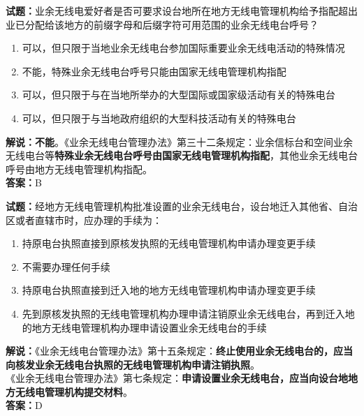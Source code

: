 \documentclass{ctexbook}
\begin{document}
\bigskip


\noindent\textbf{试题：}业余无线电爱好者是否可要求设台地所在地方无线电管理机构给予指配超出业已分配给该地方的前缀字母和后缀字符可用范围的业余无线电台呼号？
\begin{enumerate}[leftmargin=3em]
\item 可以，但只限于当地业余无线电台参加国际重要业余无线电活动的特殊情况
\item 不能，特殊业余无线电台呼号只能由国家无线电管理机构指配
\item 可以，但只限于与在当地所举办的大型国际或国家级活动有关的特殊电台
\item 可以，但只限于与当地政府组织的大型科技活动有关的特殊电台
\end{enumerate}
\textbf{解说：不能}。《业余无线电台管理办法》第三十二条规定：业余信标台和空间业余无线电台等\textbf{特殊业余无线电台呼号由国家无线电管理机构指配}，其他业余无线电台呼号由地方无线电管理机构指配。\\\noindent\textbf{答案：}B



\bigskip


\noindent\textbf{试题：}经地方无线电管理机构批准设置的业余无线电台，设台地迁入其他省、自治区或者直辖市时，应办理的手续为：
\begin{enumerate}[leftmargin=3em]
\item 持原电台执照直接到原核发执照的无线电管理机构申请办理变更手续
\item 不需要办理任何手续
\item 持原电台执照直接到迁入地的地方无线电管理机构申请办理变更手续
\item 先到原核发执照的无线电管理机构办理申请注销原业余无线电台，再到迁入地的地方无线电管理机构办理申请设置业余无线电台的手续
\end{enumerate}
\noindent\textbf{解说：}《业余无线电台管理办法》第十五条规定：\textbf{终止使用业余无线电台的，应当向核发业余无线电台执照的无线电管理机构申请注销执照}。\\
《业余无线电台管理办法》第七条规定：\textbf{申请设置业余无线电台，应当向设台地地方无线电管理机构提交材料}。\\\noindent\textbf{答案：}D%


\bigskip
\end{document}
